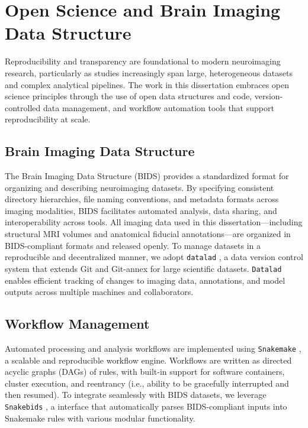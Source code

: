 \section{Open Science and Brain Imaging Data Structure}

Reproducibility and transparency are foundational to modern neuroimaging research, particularly as studies increasingly span large, heterogeneous datasets and complex analytical pipelines. The work in this dissertation embraces open science principles through the use of open data structures and code, version-controlled data management, and workflow automation tools that support reproducibility at scale.

\subsection{Brain Imaging Data Structure}

The Brain Imaging Data Structure (BIDS) \cite{Gorgolewski2016-oh} provides a standardized format for organizing and describing neuroimaging datasets. By specifying consistent directory hierarchies, file naming conventions, and metadata formats across imaging modalities, BIDS facilitates automated analysis, data sharing, and interoperability across tools. All imaging data used in this dissertation—including structural MRI volumes and anatomical fiducial annotations—are organized in BIDS-compliant formats and released openly. To manage datasets in a reproducible and decentralized manner, we adopt \texttt{datalad} \cite{Halchenko2021-px}, a data version control system that extends Git and Git-annex for large scientific datasets. \texttt{Datalad} enables efficient tracking of changes to imaging data, annotations, and model outputs across multiple machines and collaborators.

\subsection{Workflow Management}
Automated processing and analysis workflows are implemented using \texttt{Snakemake} \cite{Molder2021-ig,Koster2012-ok}, a scalable and reproducible workflow engine. Workflows are written as directed acyclic graphs (DAGs) of rules, with built-in support for software containers, cluster execution, and reentrancy (i.e., ability to be gracefully interrupted and then resumed). To integrate seamlessly with BIDS datasets, we leverage \texttt{Snakebids} \cite{Van-Dyken-Tristan-Kuehn-Jason-Kai-Dahananjhay-Bansal-Ali-Khan2020-ay}, a interface that automatically parses BIDS-compliant inputs into Snakemake rules with various modular functionality. 

